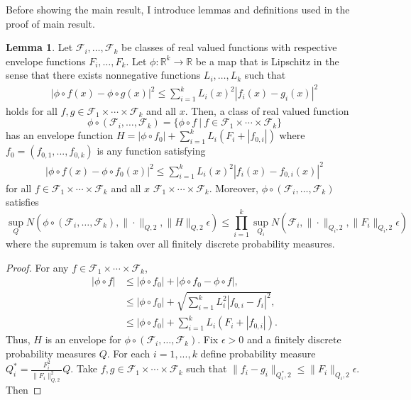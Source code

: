 \documentclass[12pt,oneside,reqno,english]{amsart}
\theoremstyle{definition}
\newtheorem{lemma}{Lemma}
\begin{document}
Before showing the main result, I introduce lemmas and definitions used in the proof of main result. 
\begin{lemma}\label{l:entropy}
Let $\mathcal{F}_{i},\ldots,\mathcal{F}_{k}$ be classes of real valued functions with respective envelope functions $F_{i},\ldots,F_{k}$.  
Let $\phi:\mathbb{R}^{k}\rightarrow \mathbb{R}$ be a map that is Lipschitz in the sense that there exists nonnegative functions $L_{i},\ldots,L_{k}$
such that 
\begin{align*}
|\phi\circ f(x) -\phi\circ g(x)|^{2}\leq \sum_{i=1}^{k}L_{i}(x)^{2}|f_{i}(x)-g_{i}(x)|^{2}
\end{align*}
holds for all $f, g\in \mathcal{F}_{1}\times\cdots \times \mathcal{F}_{k}$ and all $x$. Then, a class of real valued function 
\[\phi\circ (\mathcal{F}_{i},\ldots,\mathcal{F}_{k}) = \{\phi\circ f \ | \ f\in  \mathcal{F}_{1}\times\cdots \times \mathcal{F}_{k}\}\]
has an envelope function $H=|\phi\circ f_{0}|+\sum_{i=1}^{k}L_{i}(F_{i}+|f_{0,i}|)$ where $f_{0}=(f_{0,1},...,f_{0,k})$ is any function satisfying 
\begin{align*}
|\phi\circ f(x) -\phi\circ f_{0}(x)|^{2}\leq \sum_{i=1}^{k}L_{i}(x)^{2}|f_{i}(x)-f_{0,i}(x)|^{2}
\end{align*}
for all $f\in  \mathcal{F}_{1}\times\cdots \times \mathcal{F}_{k}$ and all $x$
$\mathcal{F}_{1}\times\cdots \times \mathcal{F}_{k}$. Moreover, $\phi\circ (\mathcal{F}_{i},\ldots,\mathcal{F}_{k})$ satisfies 
\[\sup_{Q} N(\phi\circ (\mathcal{F}_{i},\ldots,\mathcal{F}_{k}),\|\cdot\|_{Q,2},\|H\|_{Q,2}\epsilon)\leq 
\prod_{i=1}^{k}\sup_{Q_{i}} N(\mathcal{F}_{i},\| \cdot \|_{Q_{i},2},\|F_{i}\|_{Q_{i},2}\epsilon)\]
where the supremum is taken over all finitely discrete probability measures. 
\begin{proof}
For any $f\in \mathcal{F}_{1}\times\cdots \times \mathcal{F}_{k}$, 
\begin{align*}
|\phi\circ f|&\leq |\phi\circ f_{0}| + |\phi\circ f_{0}-\phi\circ f |,\\
&\leq |\phi\circ f_{0}| + \sqrt{\sum_{i=1}^{k}L_{i}^{2}|f_{0,i}-f_{i}|^{2}},\\
&\leq |\phi\circ f_{0}| + \sum_{i=1}^{k}L_{i}(F_{i}+|f_{0,i}|).
\end{align*}
Thus, $H$ is an envelope for $\phi\circ (\mathcal{F}_{i},\ldots,\mathcal{F}_{k})$. Fix $\epsilon>0$ and a finitely discrete probability measures $Q$.
For each $i=1,...,k$ define probability measure $Q^{*}_{i}=\frac{F_{i}^{2}}{\|F_{i}\|_{Q,2}^{2}}Q$.
Take $f, g\in \mathcal{F}_{1}\times\cdots \times \mathcal{F}_{k}$ such that $\|f_{i}-g_{i}\|_{Q^{*}_{i},2}\leq \|F_{i}\|_{Q_{i},2}\epsilon$. Then 

\end{proof}
\end{lemma}
\end{document}
